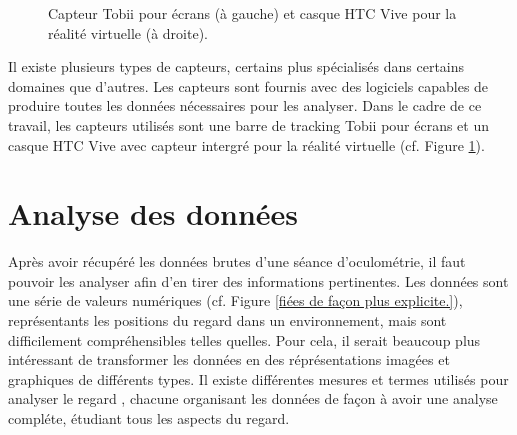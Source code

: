\documentclass[12pt]{article}
\begin{document}
\begin{figure}[htpb]
  \centering
  \qquad
  \caption{Capteur Tobii \cite{img:tobii} pour écrans (à gauche) et casque HTC
    Vive \cite{img:htcvive} pour la réalité virtuelle (à droite).}
  \label{fig:materiel}
\end{figure}

Il existe plusieurs types de capteurs, certains plus spécialisés dans certains
domaines que d'autres. Les capteurs sont fournis avec des logiciels capables de
produire toutes les données nécessaires pour les analyser. Dans le cadre de ce
travail, les capteurs utilisés sont une barre de tracking Tobii pour écrans et
un casque HTC Vive avec capteur intergré pour la réalité virtuelle (cf. Figure
\ref{fig:materiel}).


\section{Analyse des données}

Après avoir récupéré les données brutes d'une séance d'oculométrie, il faut
pouvoir les analyser afin d'en tirer des informations pertinentes. Les
données sont une série de valeurs numériques (cf. Figure \ref{fiées de façon 
plus explicite.}), représentants les positions du regard dans un environnement, 
mais sont difficilement compréhensibles telles quelles. Pour cela, il serait 
beaucoup plus intéressant de transformer les données en des réprésentations 
imagées et graphiques de différents types. Il existe différentes mesures et 
termes utilisés pour analyser le regard \cite{imotions:metrics}, chacune 
organisant les données de façon à avoir une analyse compléte, étudiant tous les 
aspects du regard.
\end{document}
